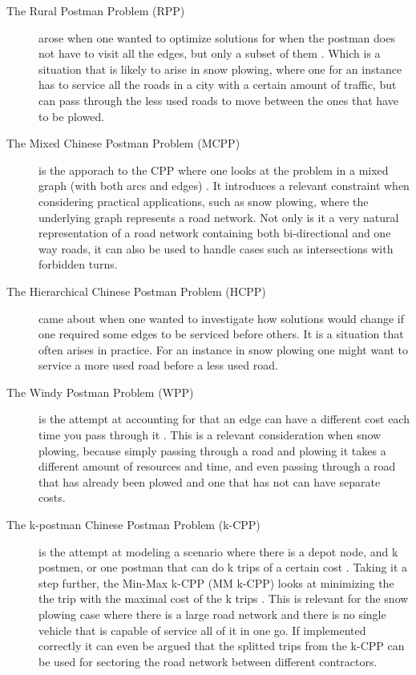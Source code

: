 \begin{description}

\item [The Rural Postman Problem (RPP)] arose when one wanted to optimize solutions for when the postman does not have to visit all the edges, but only a subset of them \citep{pearn1995RPP}. Which is a situation that is likely to arise in snow plowing, where one for an instance has to service all the roads in a city with a certain amount of traffic, but can pass through the less used roads to move between the ones that have to be plowed.

\item [The Mixed Chinese Postman Problem (MCPP)] is the apporach to the CPP where one looks at the problem in a mixed graph (with both arcs and edges) \citep{pearn1995mixedCPP}. It introduces a relevant constraint when considering practical applications, such as snow plowing, where the underlying graph represents a road network. Not only is it a very natural representation of a road network containing both bi-directional and one way roads, it can also be used to handle cases such as intersections with forbidden turns.

\item [The Hierarchical Chinese Postman Problem (HCPP)] \citep{ghiani2000HCPP} came about when one wanted to investigate how solutions would change if one required some edges to be serviced before others. It is a situation that often arises in practice. For an instance in snow plowing one might want to service a more used road before a less used road.

\item [The Windy Postman Problem (WPP)] is the attempt at accounting for that an edge can have a different cost each time you pass through it \citep{dussault2013WPP}. This is a relevant consideration when snow plowing, because simply passing through a road and plowing it takes a different amount of resources and time, and even passing through a road that has already been plowed and one that has not can have separate costs.

\item [The k-postman Chinese Postman Problem (k-CPP)] is the attempt at modeling a scenario where there is a depot node, and k postmen, or one postman that can do k trips of a certain cost \citep{edmonds1973kCPP}. Taking it a step further, the Min-Max k-CPP (MM k-CPP) looks at minimizing the the trip with the maximal cost of the k trips \citep{frederickson1976MMkCPP}. This is relevant for the snow plowing case where there is a large road network and there is no single vehicle that is capable of service all of it in one go. If implemented correctly it can even be argued that the splitted trips from the k-CPP can be used for sectoring the road network between different contractors.

\end{description}

